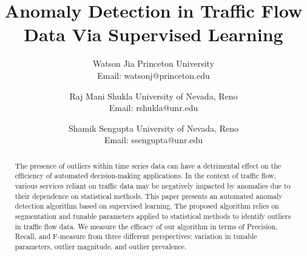 \documentclass[conference]{IEEEtran}
\begin{document}
	
	\title
	{
	Anomaly Detection in Traffic Flow Data Via Supervised Learning
	}
	
%
%
\author
{
	\IEEEauthorblockN
	{
		Watson Jia
	}
	\IEEEauthorblockA
	{
		Princeton University \\ 
		Email:                                          %
	    watsonj@princeton.edu  %
	}
	\and
	\IEEEauthorblockN
	{
		Raj Mani Shukla
	}
	\IEEEauthorblockA
	{
		University of Nevada, Reno \\
		Email:
		rshukla@unr.edu
	}
	\and
	\IEEEauthorblockN
	{
		Shamik Sengupta
	}
	\IEEEauthorblockA
	{
		University of Nevada, Reno \\
		Email:
		ssengupta@unr.edu
	}
}
%
	
\maketitle



\begin{abstract}
	      The presence of outliers within time series data can have a detrimental effect on the efficiency of automated decision-making applications. In the context of traffic flow, various services reliant on traffic data may be negatively impacted by anomalies due to their dependence on statistical methods. This paper presents an automated anomaly detection algorithm based on supervised learning. The proposed algorithm relies on segmentation and tunable parameters applied to statistical methods to identify outliers in traffic flow data. We measure the efficacy of our algorithm in terms of Precision, Recall, and F-measure from three different perspectives: variation in tunable parameters, outlier magnitude, and outlier prevalence.
\end{abstract}
	
\end{document}
